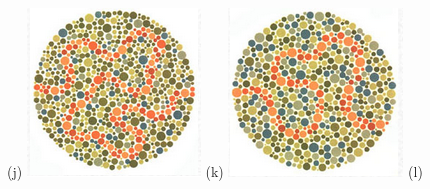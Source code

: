 \documentclass[	12pt, Times, openright, twoside, a4paper, english, brazil]{abntex2}
\begin{document}
\begin{apendicesenv}
\begin{figure}[!htb]
(j)
\endminipage\hfill
{}
\centering
{\includegraphics[width=\linewidth]{ishihara-fuga/figureIshihara32.png}}
(k)
\endminipage\hfill
{}
\centering
{\includegraphics[width=\linewidth]{ishihara-fuga/figureIshihara33.png}}
(l)


\end{figure}
\end{apendicesenv}
\end{document}

